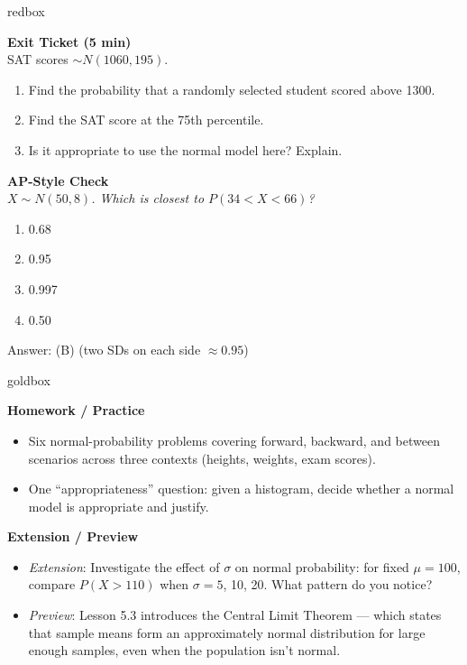 \documentclass[10pt]{article}
\begin{document}
\begin{skillbox}{redbox}
\begin{minipage}[t]{0.48\linewidth}
    \textbf{Exit Ticket (5 min)}\\
    SAT scores $\sim N(1060, 195)$.
    \begin{enumerate}
        \item Find the probability that a randomly selected student scored above 1300.
        \item Find the SAT score at the 75th percentile.
        \item Is it appropriate to use the normal model here? Explain.
    \end{enumerate}
\end{minipage}
\hfill
\begin{minipage}[t]{0.48\linewidth}
    \textbf{AP-Style Check}\\
    \textit{$X \sim N(50, 8)$. Which is closest to $P(34 < X < 66)$?}
    \begin{enumerate}[label=(\Alph*)]
        \item 0.68
        \item 0.95
        \item 0.997
        \item 0.50
    \end{enumerate}
    Answer: (B) (two SDs on each side $\approx 0.95$)
\end{minipage}
\end{skillbox}

\begin{skillbox}{goldbox}
\begin{minipage}[t]{0.48\linewidth}
    \textbf{Homework / Practice}
    \begin{itemize}
        \item Six normal-probability problems covering forward, backward, and between
              scenarios across three contexts (heights, weights, exam scores).
        \item One ``appropriateness'' question: given a histogram, decide whether a
              normal model is appropriate and justify.
    \end{itemize}
\end{minipage}
\hfill
\begin{minipage}[t]{0.48\linewidth}
    \textbf{Extension / Preview}
    \begin{itemize}
        \item \textit{Extension}: Investigate the effect of $\sigma$ on normal
              probability: for fixed $\mu = 100$, compare $P(X > 110)$ when
              $\sigma = 5$, 10, 20. What pattern do you notice?
        \item \textit{Preview}: Lesson 5.3 introduces the Central Limit Theorem ---
              which states that sample means form an approximately normal distribution
              for large enough samples, even when the population isn't normal.
    \end{itemize}
\end{minipage}
\end{skillbox}
\end{document}
